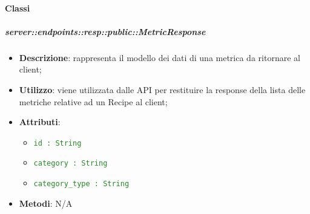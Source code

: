   \paragraph{Classi}

    \subparagraph{server::endpoints::resp::public::MetricResponse} %
    \label{subp:bdsm_app_server_endpoints_resp_public_metricresponse}
    \begin{itemize}
      \item \textbf{Descrizione}: rappresenta il modello dei dati di una metrica da ritornare al client;
      \item \textbf{Utilizzo}: viene utilizzata dalle API per restituire la response della lista delle metriche relative ad un Recipe al client;
    \item \textbf{Attributi}:
    \begin{itemize}
        \item \textcolor{forestgreen}{\texttt{id : String}}
        \item \textcolor{forestgreen}{\texttt{category : String}}
        \item \textcolor{forestgreen}{\texttt{category\_type : String}}
     \end{itemize}
    \item \textbf{Metodi}: N/A
    \end{itemize}

